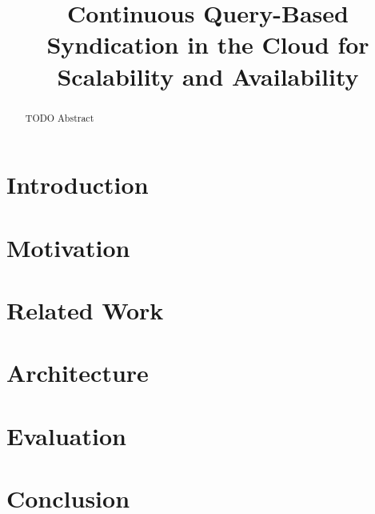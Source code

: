 \documentclass[conference]{IEEEtran}
\begin{document}
\title{Continuous Query-Based Syndication in the Cloud for Scalability and Availability}

\author{
\and
{}
}

\maketitle

\begin{abstract}
TODO Abstract
\end{abstract}

\section{Introduction} %


\section{Motivation} 

\section{Related Work} %

\section{Architecture} %

\section{Evaluation}

\section{Conclusion}



\end{document}
